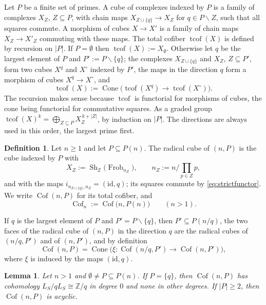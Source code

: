 \documentclass[11pt]{amsart}
\newtheorem{lemma}[theorem]{Lemma}
\theoremstyle{definition}
\newtheorem{definition}[theorem]{Definition}
\newcommand{\Z}{\mathbb Z}
\newcommand{\Frob}{\operatorname{Frob}}
\newcommand{\Sh}{\operatorname{Sh}}
\newcommand{\Prim}{\operatorname{Cof}}
\newcommand{\Cone}{\operatorname{Cone}}
\newcommand{\tcof}{\operatorname{tcof}}
\begin{document}
Let $P$ be a finite set of primes.  A cube of complexes indexed by $P$ is a
family of complexes $X_Z$, $Z\subseteq P$, with chain maps
$X_{Z\cup\{q\}}\to X_Z$ for $q\in P\smallsetminus Z$, such that all squares
commute.  A morphism of cubes $X\to X'$ is a family of chain maps
$X_Z\to X'_Z$ commuting with these maps.  The total cofiber $\tcof(X)$ is
defined by recursion on $|P|$.  If $P=\emptyset$ then
$\tcof(X):=X_\emptyset$.  Otherwise let $q$ be the largest element of $P$ and
$P':=P\smallsetminus\{q\}$; the complexes $X_{Z\cup\{q\}}$ and $X_Z$,
$Z\subseteq P'$, form two cubes $X^{q}$ and $X^{\circ}$ indexed by $P'$, the
maps in the direction $q$ form a morphism of cubes $X^{q}\to X^{\circ}$, and
\[
  \tcof(X):=\Cone\bigl(\tcof(X^{q})\to\tcof(X^{\circ})\bigr).
\]
The recursion makes sense because $\tcof$ is functorial for morphisms of
cubes, the cone being functorial for commutative squares.  As a graded group
$\tcof(X)^k=\bigoplus_{Z\subseteq P}X_Z^{\,k+|Z|}$, by induction on $|P|$.  The
directions are always used in this order, the largest prime first.

\begin{definition}\label{def:prim}
Let $n\ge1$ and let $P\subseteq P(n)$.  The radical cube of $(n,P)$ is the
cube indexed by $P$ with
\[
  X_Z:=\Sh_\Z\bigl(\Frob_{n_Z}\bigr),\qquad n_Z:=n\big/\!\prod_{p\in Z}p,
\]
and with the maps $i_{n_{Z\cup\{q\}},n_Z}=(\mathrm{id},q)$; its squares
commute by \eqref{eq:strictfunctor}.  We write $\Prim(n,P)$ for its total
cofiber, and
\[
  \Prim_n:=\Prim\bigl(n,P(n)\bigr)\qquad(n>1).
\]
\end{definition}

If $q$ is the largest element of $P$ and $P'=P\smallsetminus\{q\}$, then
$P'\subseteq P(n/q)$, the two faces of the radical cube of $(n,P)$ in the
direction $q$ are the radical cubes of $(n/q,P')$ and of $(n,P')$, and by
definition
\begin{equation}\label{eq:primrec}
  \Prim(n,P)=\Cone\bigl(\xi:\Prim(n/q,P')\to\Prim(n,P')\bigr),
\end{equation}
where $\xi$ is induced by the maps $(\mathrm{id},q)$.

\begin{lemma}\label{lem:primstructure}
Let $n>1$ and $\emptyset\ne P\subseteq P(n)$.  If $P=\{q\}$, then
$\Prim(n,P)$ has cohomology $L_S/qL_S\cong\Z/q$ in degree $0$ and none in
other degrees.  If $|P|\ge2$, then $\Prim(n,P)$ is acyclic.
\end{lemma}
\end{document}
